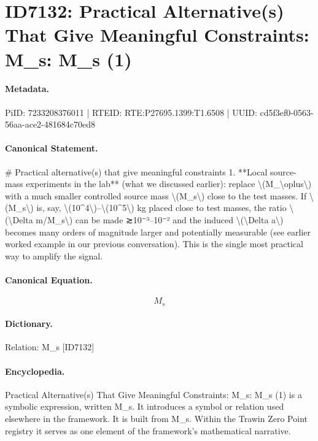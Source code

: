 \section*{ID7132: Practical Alternative(s) That Give Meaningful Constraints: M\_s: M\_s (1)}
\paragraph{Metadata.}
PiID: 7233208376011 | RTEID: RTE:P27695.1399:T1.6508 | UUID: cd5f3ef0-0563-56aa-ace2-481684c70ed8

\paragraph{Canonical Statement.}
\# Practical alternative(s) that give meaningful constraints 1. **Local source-mass experiments in the lab** (what we discussed earlier): replace \textbackslash{}(M\_\textbackslash{}oplus\textbackslash{}) with a much smaller controlled source mass \textbackslash{}(M\_s\textbackslash{}) close to the test masses. If \textbackslash{}(M\_s\textbackslash{}) is, say, \textbackslash{}(10\textasciicircum{}4\textbackslash{})–\textbackslash{}(10\textasciicircum{}5\textbackslash{}) kg placed close to test masses, the ratio \textbackslash{}(\textbackslash{}Delta m/M\_s\textbackslash{}) can be made ≳10⁻³–10⁻² and the induced \textbackslash{}(\textbackslash{}Delta a\textbackslash{}) becomes many orders of magnitude larger and potentially measurable (see earlier worked example in our previous conversation). This is the single most practical way to amplify the signal.

\paragraph{Canonical Equation.}
\[
M_s
\]

\paragraph{Dictionary.}
Relation: M\_s [ID7132]

\paragraph{Encyclopedia.}
Practical Alternative(s) That Give Meaningful Constraints: M\_s: M\_s (1) is a symbolic expression, written M\_s. It introduces a symbol or relation used elsewhere in the framework. It is built from M\_s. Within the Trawin Zero Point registry it serves as one element of the framework's mathematical narrative.
